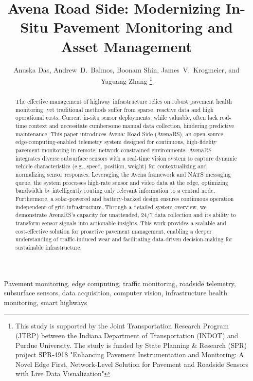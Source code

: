 \documentclass[conference]{IEEEtran}
\title{\LARGE \bf
    Avena Road Side: Modernizing In-Situ Pavement Monitoring and Asset Management\squeezeupaftertitle%
}
\author{
     Anuska Das, Andrew~D.~Balmos, Boonam Shin, James~V.~Krogmeier, and Yaguang Zhang\squeezeupafterauthors%
    \thanks{
        This study is supported by the Joint Transportation Research Program (JTRP) between the Indiana Department of Transportation (INDOT) and Purdue University. The study is funded by State Planning & Research (SPR) project SPR-4918 "Enhancing Pavement Instrumentation and Monitoring: A Novel Edge First, Network-Level Solution for Pavement and Roadside Sensors with Live Data Visualization"}%
}
\begin{document}
\maketitle
\thispagestyle{empty}
\pagestyle{empty}

\begin{abstract}
The effective management of highway infrastructure relies on robust pavement health monitoring, yet traditional methods suffer from sparse, reactive data and high operational costs. Current in-situ sensor deployments, while valuable, often lack real-time context and necessitate cumbersome manual data collection, hindering predictive maintenance. This paper introduces Avena: Road Side (AvenaRS), an open-source, edge-computing-enabled telemetry system designed for continuous, high-fidelity pavement monitoring in remote, network-constrained environments. AvenaRS integrates diverse subsurface sensors with a real-time vision system to capture dynamic vehicle characteristics (e.g., speed, position, weight) for contextualizing and normalizing sensor responses. Leveraging the Avena framework and NATS messaging queue, the system processes high-rate sensor and video data at the edge, optimizing bandwidth by intelligently routing only relevant information to a central node. Furthermore, a solar-powered and battery-backed design ensures continuous operation independent of grid infrastructure. Through a detailed system overview, we demonstrate AvenaRS's capacity for unattended, 24/7 data collection and its ability to transform sensor signals into actionable insights. This work provides a scalable and cost-effective solution for proactive pavement management, enabling a deeper understanding of traffic-induced wear and facilitating data-driven decision-making for sustainable infrastructure.

\end{abstract}

\begin{IEEEkeywords}
Pavement monitoring, edge computing, traffic monitoring, roadside telemetry, subsurface sensors, data acquisition, computer vision, infrastructure health monitoring, smart highways

\end{IEEEkeywords}
\end{document}
